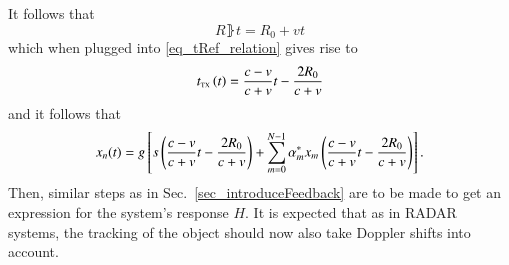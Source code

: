 It follows that
\begin{equation}
    \label{eq_fut_constV_Rt}
    R\rBrace{t} = R_{0} + vt
\end{equation}
which when plugged into \eqref{eq_tRef_relation} gives rise to
\begin{equation}
    \label{eq_fut_constV_ti}
    t_{\text{\tiny{TX}}}\left({t}\right)=\frac{c-v}{c+v}t-\frac{2R_{0}}{c+v}
\end{equation}
and it follows that
\begin{equation}
    \label{eq_fut_constV_xn}
    x_{n}(t) = g\left[{s\left({\frac{c-v}{c+v}t-\frac{2R_{0}}{c+v}}\right)
    +\sum_{m=0}^{N-1}{\alpha^{*}_{m}x_{m}\left({\frac{c-v}{c+v}t-\frac{2R_{0}}{c+v}}\right)}}\right].
\end{equation}
Then, similar steps as in Sec.~\ref{sec_introduceFeedback} are to be made to get an expression for the system's response $H$.
It is expected that as in RADAR systems, the tracking of the object should now also take Doppler shifts into account.
